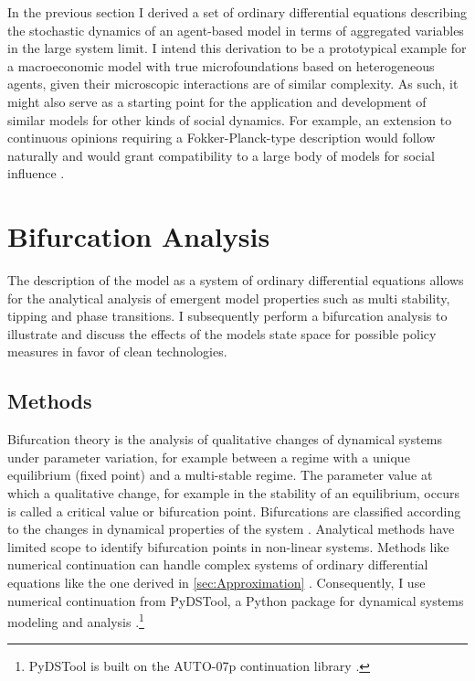 In the previous section I derived a set of ordinary differential equations describing the stochastic dynamics of an agent-based model in terms of aggregated variables in the large system limit. I intend this derivation to be a prototypical example for a macroeconomic model with true microfoundations based on heterogeneous agents, given their microscopic interactions are of similar complexity. As such, it might also serve as a starting point for the application and development of similar models for other kinds of social dynamics. For example, an extension to continuous opinions requiring a Fokker-Planck-type description would follow naturally and would grant compatibility to a large body of models for social influence \citep[see][pp. 988 f.]{Mueller-Hansen2017}.

\section{Bifurcation Analysis}
\label{sec:bifurcation-analysis}

The description of the model as a system of ordinary differential equations allows for the analytical analysis of emergent model properties such as multi stability, tipping and phase transitions. 
I subsequently perform a bifurcation analysis to illustrate and discuss the effects of the models state space for possible policy measures in favor of clean technologies.

\subsection{Methods}
Bifurcation theory is the analysis of qualitative changes of dynamical systems under parameter variation, for example between a regime with a unique equilibrium (fixed point) and a multi-stable regime.
The parameter value at which a qualitative change, for example in the stability of an equilibrium, occurs is called a critical value or bifurcation point. Bifurcations are classified according to the changes in dynamical properties of the system \citep{Strogatz1994,Kuznetsov1998}.
Analytical methods have limited scope to identify bifurcation points in non-linear systems. Methods like numerical continuation can handle complex systems of ordinary differential equations like the one derived in \cref{sec:Approximation} \citep{Allgower2003}.
Consequently, I use numerical continuation from PyDSTool, a Python package for dynamical systems modeling and analysis \citep{pydstool,10.1371/journal.pcbi.1002628}.\footnote{PyDSTool is built on the AUTO-07p continuation library \citep{Doedel07auto-07p:continuation}.}

